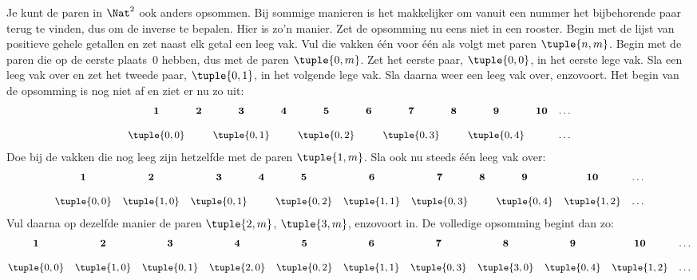 \documentclass[../../../include/open-logic-section]{subfiles}
\begin{document}


\begin{explain}
Je kunt de paren in $\Nat^2$ ook anders opsommen. Bij sommige manieren is het
makkelijker om vanuit een nummer het bijbehorende paar terug te vinden, dus om
de inverse te bepalen. Hier is zo'n manier. Zet de opsomming nu eens niet in
een rooster. Begin met de lijst van positieve gehele getallen en zet naast elk
getal een leeg vak. Vul die vakken één voor één als volgt met paren
$\tuple{n,m}$. Begin met de paren die op de eerste plaats~$0$ hebben, dus met
de paren $\tuple{0,m}$. Zet het eerste paar, $\tuple{0,0}$, in het eerste lege
vak. Sla een leeg vak over en zet het tweede paar, $\tuple{0,1}$, in het
volgende lege vak. Sla daarna weer een leeg vak over, enzovoort. Het begin van
de opsomming is nog niet af en ziet er nu zo uit:
\[\small
\begin{array}{@{}c c c c c c c c c c c@{}}
\mathbf 1 & \mathbf 2 & \mathbf 3 & \mathbf 4 & \mathbf 5 & \mathbf 6 & \mathbf 7 & \mathbf 8 & \mathbf 9 & \mathbf{10} & \dots \\ \\
\tuple{0,0} &  & \tuple{0,1} &  & \tuple{0,2} &  & \tuple{0,3} & & \tuple{0,4} &  & \dots \\
\end{array}
\]
Doe bij de vakken die nog leeg zijn hetzelfde met de paren $\tuple{1,m}$.
Sla ook nu steeds één leeg vak over:
\[\small
\begin{array}{@{}c c c c c c c c c c c@{}}
\mathbf 1 & \mathbf 2 & \mathbf 3 & \mathbf 4 & \mathbf 5 & \mathbf 6 & \mathbf 7 & \mathbf 8 & \mathbf 9 & \mathbf{10} & \dots \\ \\
\tuple{0,0} & \tuple{1,0} & \tuple{0,1} &  & \tuple{0,2} & \tuple{1,1} & 
\tuple{0,3} & & \tuple{0,4} &  \tuple{1,2} & \dots \\
\end{array}
\]
Vul daarna op dezelfde manier de paren $\tuple{2,m}$, $\tuple{3,m}$,
enzovoort in. De volledige opsomming begint dan zo:
\[\small
\begin{array}{@{}cc c c c c c c c c c@{}}
\mathbf 1 & \mathbf 2 & \mathbf 3 & \mathbf 4 & \mathbf 5 & \mathbf 6 & \mathbf 7 & \mathbf 8 & \mathbf 9 & \mathbf{10} & \dots \\ \\
\tuple{0,0} & \tuple{1,0} & \tuple{0,1} & \tuple{2,0}  & \tuple{0,2} & 
\tuple{1,1} & \tuple{0,3} & \tuple{3,0}  & \tuple{0,4} &  \tuple{1,2} & \dots \\

\end{array}\]
\end{explain}
\end{document}
